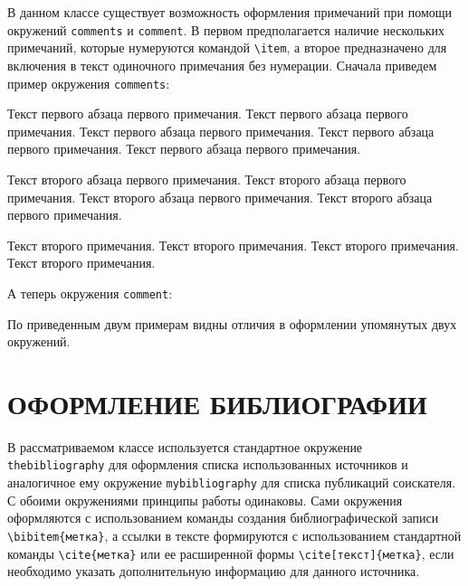 В данном классе существует возможность оформления примечаний при помощи
окружений \verb|comments| и \verb|comment|. В первом предполагается наличие
нескольких примечаний, которые нумеруются командой \verb|\item|, а второе
предназначено для включения в текст одиночного примечания без нумерации. Сначала
приведем пример окружения \verb|comments|:

\begin{comments}
\item Текст первого абзаца первого примечания. Текст первого абзаца первого
примечания. Текст первого абзаца первого примечания. Текст первого абзаца
первого примечания. Текст первого абзаца первого примечания.

Текст второго абзаца первого примечания. Текст второго абзаца первого
примечания. Текст второго абзаца первого примечания. Текст второго абзаца
первого примечания.

\item Текст второго примечания. Текст второго примечания. Текст второго
примечания. Текст второго примечания.
\end{comments}

А теперь окружения \verb|comment|:

По приведенным двум примерам видны отличия в оформлении упомянутых двух
окружений.


\chapter{ОФОРМЛЕНИЕ БИБЛИОГРАФИИ}

В рассматриваемом классе используется стандартное окружение
\verb|thebibliography| для оформления списка использованных источников и
аналогичное ему окружение \verb|mybibliography| для списка публикаций
соискателя. С обоими окружениями принципы работы одинаковы. Сами окружения
оформляются с использованием команды создания библиографической записи
\verb|\bibitem{метка}|, а ссылки в тексте формируются с использованием
стандартной команды \verb|\cite{метка}| или ее расширенной формы
\verb|\cite[текст]{метка}|, если необходимо указать дополнительную информацию
для данного источника.


